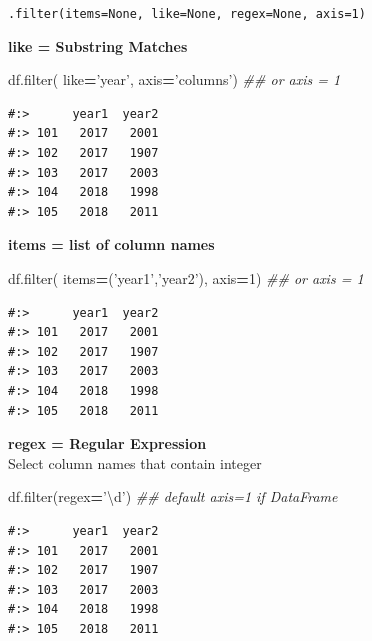 \documentclass[
]{book}
\newenvironment{Shaded}{\begin{snugshade}}{\end{snugshade}}
\newcommand{\BuiltInTok}[1]{#1}
\newcommand{\CommentTok}[1]{\textcolor[rgb]{0.37,0.37,0.37}{\textit{#1}}}
\newcommand{\DecValTok}[1]{\textcolor[rgb]{0.06,0.06,0.06}{#1}}
\newcommand{\NormalTok}[1]{#1}
\newcommand{\OperatorTok}[1]{\textcolor[rgb]{0.43,0.43,0.43}{\textbf{#1}}}
\newcommand{\StringTok}[1]{\textcolor[rgb]{0.5,0.5,0.5}{#1}}
\begin{document}
\texttt{.filter(items=None,\ like=None,\ regex=None,\ axis=1)}

\textbf{like = Substring Matches}

\begin{Shaded}
\begin{Highlighting}[]
\NormalTok{df.}\BuiltInTok{filter}\NormalTok{( like}\OperatorTok{=}\StringTok{'year'}\NormalTok{,  axis}\OperatorTok{=}\StringTok{'columns'}\NormalTok{)  }\CommentTok{## or axis = 1}
\end{Highlighting}
\end{Shaded}

\begin{verbatim}
#:>      year1  year2
#:> 101   2017   2001
#:> 102   2017   1907
#:> 103   2017   2003
#:> 104   2018   1998
#:> 105   2018   2011
\end{verbatim}

\textbf{items = list of column names}

\begin{Shaded}
\begin{Highlighting}[]
\NormalTok{df.}\BuiltInTok{filter}\NormalTok{( items}\OperatorTok{=}\NormalTok{(}\StringTok{'year1'}\NormalTok{,}\StringTok{'year2'}\NormalTok{),  axis}\OperatorTok{=}\DecValTok{1}\NormalTok{)  }\CommentTok{## or axis = 1}
\end{Highlighting}
\end{Shaded}

\begin{verbatim}
#:>      year1  year2
#:> 101   2017   2001
#:> 102   2017   1907
#:> 103   2017   2003
#:> 104   2018   1998
#:> 105   2018   2011
\end{verbatim}

\textbf{regex = Regular Expression}\\
Select column names that contain integer

\begin{Shaded}
\begin{Highlighting}[]
\NormalTok{df.}\BuiltInTok{filter}\NormalTok{(regex}\OperatorTok{=}\StringTok{'\textbackslash{}d'}\NormalTok{)  }\CommentTok{## default axis=1 if DataFrame}
\end{Highlighting}
\end{Shaded}

\begin{verbatim}
#:>      year1  year2
#:> 101   2017   2001
#:> 102   2017   1907
#:> 103   2017   2003
#:> 104   2018   1998
#:> 105   2018   2011
\end{verbatim}
\end{document}
